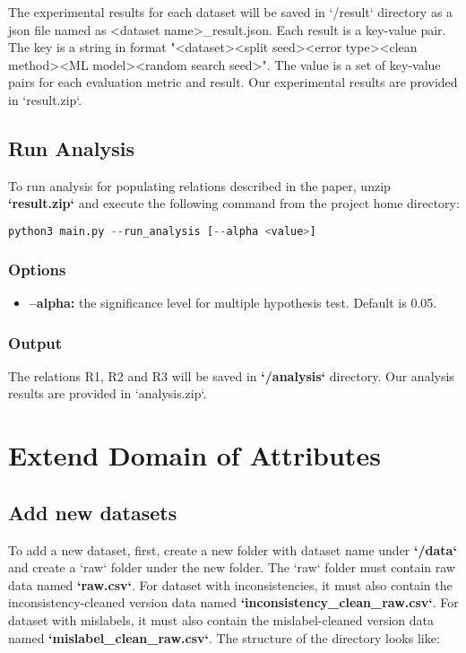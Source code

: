 The experimental results for each dataset will be saved in `/result` directory as a json file named as <dataset name>\_result.json. Each result is a key-value pair. The key is a string in format "<dataset><split seed><error type><clean method><ML model><random search seed>". The value is a set of key-value pairs for each evaluation metric and result. Our experimental results are provided in `result.zip`.


\subsection*{Run Analysis}
To run analysis for populating relations described in the paper, unzip \textbf{`result.zip`} and execute the following command from the project home directory:

\begin{lstlisting}[language=python]
		python3 main.py --run_analysis [--alpha <value>]
\end{lstlisting}

\subsubsection*{Options}

\begin{itemize}
	\item {
	\textbf{--alpha:} the significance level for multiple hypothesis test. Default is 0.05.	
}
\end{itemize}


\subsubsection*{Output}
The relations R1, R2 and R3 will be saved in \textbf{`/analysis`} directory. Our analysis results are provided in `analysis.zip`.


\section{Extend Domain of Attributes}

\subsection*{Add new datasets}

To add a new dataset, first, create a new folder with dataset name under \textbf{`/data`} and create a `raw` folder under the new folder.  The `raw` folder must contain raw data named \textbf{`raw.csv`}. For dataset with inconsistencies, it must also contain the inconsistency-cleaned version data named \textbf{`inconsistency\_clean\_raw.csv`}. For dataset with mislabels, it must also contain the mislabel-cleaned version data named \textbf{`mislabel\_clean\_raw.csv`}. The structure of the directory looks like:


